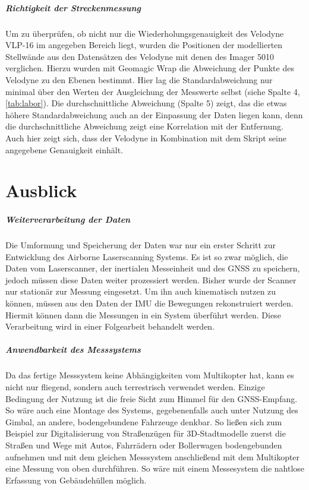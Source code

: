 \documentclass[a4paper,12pt,bibliography=totoc, listof=totoc,titlepage,pointlessnumbers]{scrreprt}
\begin{document}
\paragraph{Richtigkeit der Streckenmessung}
Um zu überprüfen, ob nicht nur die Wiederholungsgenauigkeit des Velodyne VLP-16 im angegeben Bereich liegt, wurden die Positionen der modellierten Stellwände aus den Datensätzen des Velodyne mit denen des Imager 5010 verglichen. Hierzu wurden mit Geomagic Wrap die Abweichung der Punkte des Velodyne zu den Ebenen bestimmt. Hier lag die Standardabweichung nur minimal über den Werten der Ausgleichung der Messwerte selbst (siehe Spalte 4, \autoref{tab:labor}). Die durchschnittliche Abweichung (Spalte 5) zeigt, das die etwas höhere Standardabweichung auch an der Einpassung der Daten liegen kann, denn die durchschnittliche Abweichung zeigt eine Korrelation mit der Entfernung. 
Auch hier zeigt sich, dass der Velodyne in Kombination mit dem Skript seine angegebene Genauigkeit einhält.

\chapter{Ausblick}
\label{c:ausblick}

\paragraph{Weiterverarbeitung der Daten}
Die Umformung und Speicherung der Daten war nur ein erster Schritt zur Entwicklung des Airborne Laserscanning Systems. Es ist so zwar möglich, die Daten vom Laserscanner, der inertialen Messeinheit und des GNSS zu speichern, jedoch müssen diese Daten weiter prozessiert werden. Bisher wurde der Scanner nur stationär zur Messung eingesetzt. Um  ihn auch kinematisch nutzen zu können, müssen aus den Daten der IMU die Bewegungen rekonstruiert werden. Hiermit können dann die Messungen in ein System überführt werden. Diese Verarbeitung wird in einer Folgearbeit behandelt werden.

\paragraph{Anwendbarkeit des Messsystems}
Da das fertige Messsystem keine Abhängigkeiten vom Multikopter hat, kann es nicht nur fliegend, sondern auch terrestrisch verwendet werden. Einzige Bedingung der Nutzung ist die freie Sicht zum Himmel für den GNSS-Empfang. So wäre auch eine Montage des Systems, gegebenenfalls auch unter Nutzung des Gimbal, an andere, bodengebundene Fahrzeuge denkbar. So ließen sich zum Beispiel zur Digitalisierung von Straßenzügen für 3D-Stadtmodelle zuerst die Straßen und Wege mit Autos, Fahrrädern oder Bollerwagen bodengebunden aufnehmen und mit dem gleichen Messsystem anschließend mit dem Multikopter eine Messung von oben durchführen. So wäre mit einem Messesystem die nahtlose Erfassung von Gebäudehüllen möglich.
\end{document}
